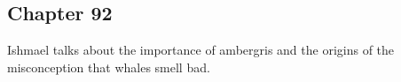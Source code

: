 \subsection{Chapter 92}

Ishmael talks about the importance of ambergris and the origins of the
misconception that whales smell bad.
